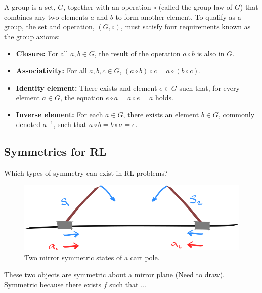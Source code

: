 A group is a set, $G$, together with an operation $\circ$ (called the group law
of $G$) that combines any two elements $a$ and $b$ to form another element.
To qualify as a group, the set and operation, $(G, \circ)$, must satisfy four requirements known as the group axioms:

\begin{itemize}
	\tightlist
	\item \textbf{Closure:} For all $a, b \in G$, the result of the operation $a \circ b$ is also in $G$.
	\item \textbf{Associativity:} For all $a,b,c \in G$, $(a\circ b) \circ c = a\circ (b\circ c)$.
	\item \textbf{Identity element:} There exists and element $e\in G$ such that, for every element $a\in G$, the equation $e\circ a = a\circ e = a$ holds.
	\item \textbf{Inverse element:} For each $a \in G$, there exists an element $b \in G$, commonly denoted $a^{−1}$, such that $a \circ b = b \circ a = e$.
\end{itemize}

\subsection{Symmetries for RL}\label{mdp-homomorphism}

Which types of symmetry can exist in RL problems?

\begin{figure}[h!]
	\centering
	\includegraphics[width=1\textwidth,height=0.25\textheight]{../../pictures/drawings/cart-pole-mirror.png}
	\caption{Two mirror symmetric states of a cart pole.}
\end{figure}


These two objects are symmetric about a mirror plane (Need to draw).
Symmetric because there exists $f$ such that ...

%

